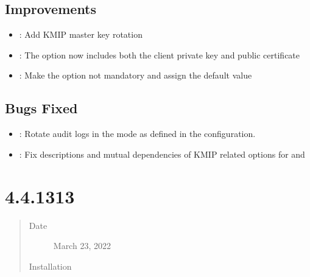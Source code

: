 \documentclass[letterpaper,10pt,english]{sphinxmanual}
\begin{document}
\subsection{Improvements}
\label{\detokenize{release_notes/4.4.14-14:improvements}}\begin{itemize}
\item {} 
\sphinxAtStartPar
{}: Add KMIP master key rotation

\item {} 
\sphinxAtStartPar
{}: The  option now includes both the client private key and public certificate

\item {} 
\sphinxAtStartPar
{}: Make the  option not mandatory and assign the default value

\end{itemize}


\subsection{Bugs Fixed}
\label{\detokenize{release_notes/4.4.14-14:bugs-fixed}}\begin{itemize}
\item {} 
\sphinxAtStartPar
{}: Rotate audit logs in the mode as defined in the configuration.

\item {} 
\sphinxAtStartPar
{}: Fix descriptions and mutual dependencies of KMIP related options for  and 

\end{itemize}


\section{ 4.4.13\sphinxhyphen{}13}
\label{\detokenize{release_notes/4.4.13-13:percona-server-for-mongodb-4-4-13-13}}\label{\detokenize{release_notes/4.4.13-13:psmdb-4-4-13-13}}\label{\detokenize{release_notes/4.4.13-13::doc}}\begin{quote}\begin{description}
\item[{Date}] \leavevmode
\sphinxAtStartPar
March 23, 2022

\item[{Installation}] \leavevmode
\sphinxAtStartPar
{}

\end{description}\end{quote}
\end{document}
